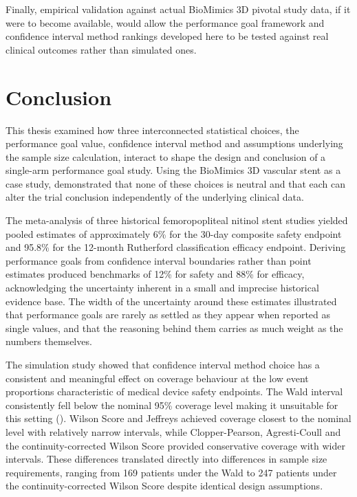 \documentclass{article}
\begin{document}
Finally, empirical validation against actual BioMimics 3D pivotal study
data, if it were to become available, would allow the performance goal
framework and confidence interval method rankings developed here to be
tested against real clinical outcomes rather than simulated ones.

\newpage

\section*{Conclusion}\label{conclusion}

This thesis examined how three interconnected statistical choices, the
performance goal value, confidence interval method and assumptions
underlying the sample size calculation, interact to shape the design and
conclusion of a single-arm performance goal study. Using the BioMimics
3D vascular stent as a case study, demonstrated that none of these
choices is neutral and that each can alter the trial conclusion
independently of the underlying clinical data.

The meta-analysis of three historical femoropopliteal nitinol stent
studies yielded pooled estimates of approximately 6\% for the 30-day
composite safety endpoint and 95.8\% for the 12-month Rutherford
classification efficacy endpoint. Deriving performance goals from
confidence interval boundaries rather than point estimates produced
benchmarks of 12\% for safety and 88\% for efficacy, acknowledging the
uncertainty inherent in a small and imprecise historical evidence base.
The width of the uncertainty around these estimates illustrated that
performance goals are rarely as settled as they appear when reported as
single values, and that the reasoning behind them carries as much weight
as the numbers themselves.

The simulation study showed that confidence interval method choice has a
consistent and meaningful effect on coverage behaviour at the low event
proportions characteristic of medical device safety endpoints. The Wald
interval consistently fell below the nominal 95\% coverage level making
it unsuitable for this setting ().
Wilson Score and Jeffreys achieved coverage closest to the nominal level
with relatively narrow intervals, while Clopper-Pearson, Agresti-Coull
and the continuity-corrected Wilson Score provided conservative coverage
with wider intervals. These differences translated directly into
differences in sample size requirements, ranging from 169 patients under
the Wald to 247 patients under the continuity-corrected Wilson Score
despite identical design assumptions.
\end{document}
